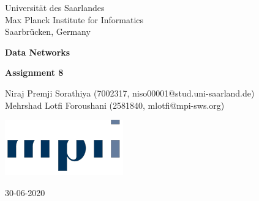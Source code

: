 \documentclass[fleqn]{article}
\begin{document}
\begin{titlepage}
	\clearpage\thispagestyle{empty}
	\centering
	\vspace{1cm}

	{\normalsize Universität des Saarlandes \\ 
		Max Planck Institute for Informatics \\
		Saarbrücken, Germany \par}
		\vspace{3cm}
	{\Huge \textbf{Data Networks}} \\
	\vspace{1cm}
	{\large \textbf{Assignment 8} \par}
	\vspace{4cm}
	{\normalsize Niraj Premji Sorathiya (7002317, niso00001@stud.uni-saarland.de)   \\ %
	             Mehrshad Lotfi Foroushani (2581840, mlotfi@mpi-sws.org)\par}
	\vspace{5cm}
    
    \centering \includegraphics[scale=0.6]{logo.png}
    
    \vspace{0.5cm}
		
	{\normalsize 30-06-2020 \par}
	
	\pagebreak

\end{titlepage}


    
%    
%    
%    
\end{document}
